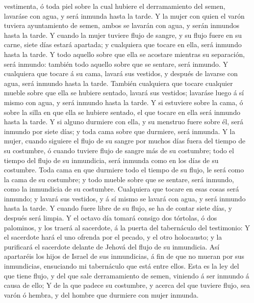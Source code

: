 vestimenta, ó toda piel sobre la cual hubiere el derramamiento del
semen, lavaráse con agua, y será inmunda hasta la tarde.  Y
la mujer con quien el varón tuviera ayuntamiento de semen, ambos se
lavarán con agua, y serán inmundos hasta la tarde.  Y
cuando la mujer tuviere flujo de sangre, y su flujo fuere en su carne,
siete días estará apartada; y cualquiera que tocare en ella, será
inmundo hasta la tarde.  Y todo aquello sobre que ella se
acostare mientras su separación, será inmundo: también todo aquello
sobre que se sentare, será inmundo.  Y cualquiera que
tocare á su cama, lavará sus vestidos, y después de lavarse con agua,
será inmundo hasta la tarde.  También cualquiera que tocare
cualquier mueble sobre que ella se hubiere sentado, lavará sus vestidos;
lavaráse luego á sí mismo con agua, y será inmundo hasta la tarde.
 Y si estuviere sobre la cama, ó sobre la silla en que ella
se hubiere sentado, el que tocare en ella será inmundo hasta la tarde.
 Y si alguno durmiere con ella, y su menstruo fuere sobre
él, será inmundo por siete días; y toda cama sobre que durmiere, será
inmunda.  Y la mujer, cuando siguiere el flujo de su sangre
por muchos días fuera del tiempo de su costumbre, ó cuando tuviere flujo
de sangre más de su costumbre; todo el tiempo del flujo de su
inmundicia, será inmunda como en los días de su costumbre. 
Toda cama en que durmiere todo el tiempo de su flujo, le será como la
cama de su costumbre; y todo mueble sobre que se sentare, será inmundo,
como la inmundicia de su costumbre.  Cualquiera que tocare
en esas cosas será inmundo; y lavará sus vestidos, y á sí mismo se
lavará con agua, y será inmundo hasta la tarde.  Y cuando
fuere libre de su flujo, se ha de contar siete días, y después será
limpia.  Y el octavo día tomará consigo dos tórtolas, ó dos
palominos, y los traerá al sacerdote, á la puerta del tabernáculo del
testimonio:  Y el sacerdote hará el uno ofrenda por el
pecado, y el otro holocausto; y la purificará el sacerdote delante de
Jehová del flujo de su inmundicia.  Así apartaréis los
hijos de Israel de sus inmundicias, á fin de que no mueran por sus
inmundicias, ensuciando mi tabernáculo que está entre ellos.
 Esta es la ley del que tiene flujo, y del que sale
derramamiento de semen, viniendo á ser inmundo á causa de ello;
 Y de la que padece su costumbre, y acerca del que tuviere
flujo, sea varón ó hembra, y del hombre que durmiere con mujer inmunda.

